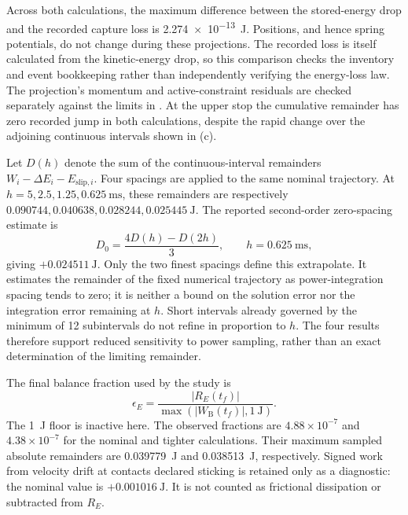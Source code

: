 \documentclass[11pt]{report}
\numberwithin{equation}{section}
\begin{document}
Across both calculations, the maximum difference between the stored-energy
drop and the recorded capture loss is \SI{2.274e-13}{J}. Positions, and hence
spring potentials, do not change during these projections. The recorded
loss is itself calculated from the kinetic-energy drop, so this comparison
checks the inventory and event bookkeeping rather than independently
verifying the energy-loss law. The projection's momentum and active-constraint
residuals are checked separately against the limits in
. At the upper stop the cumulative
remainder has zero recorded jump in both calculations, despite the rapid
change over the adjoining continuous intervals shown in
(c).

Let \(D(h)\) denote the sum of the continuous-interval remainders
\(W_i-\Delta E_i-E_{\mathrm{slip},i}\). Four spacings are applied to the
same nominal trajectory. At \(h=5,2.5,1.25,0.625~\mathrm{ms}\), these
remainders are respectively \(0.090744,0.040638,0.028244,0.025445~\mathrm{J}\).
The reported second-order zero-spacing estimate is
\begin{equation}
  D_0=\frac{4D(h)-D(2h)}{3},
  \qquad h=0.625~\mathrm{ms},
  \label{eq:energy_quadrature_extrapolate}
\end{equation}
giving \(+0.024511~\mathrm{J}\). Only the two finest spacings define this
extrapolate. It estimates the remainder of the fixed numerical trajectory
as power-integration spacing tends to zero; it is neither a bound on the
solution error nor the integration error remaining at \(h\). Short intervals
already governed by the minimum of 12 subintervals do not refine in proportion
to \(h\). The four results therefore support reduced sensitivity to power
sampling, rather than an exact determination of the limiting remainder.

The final balance fraction used by the study is
\begin{equation}
  \epsilon_E
  =\frac{|R_E(t_f)|}{\max\!\left(|W_{\mathrm{B}}(t_f)|,1~\mathrm{J}\right)}.
  \label{eq:energy_final_balance_fraction}
\end{equation}
The \SI{1}{J} floor is inactive here. The observed fractions are
\(4.88\times10^{-7}\) and \(4.38\times10^{-7}\) for the nominal and tighter
calculations. Their maximum sampled absolute remainders are
\SI{0.039779}{J} and \SI{0.038513}{J}, respectively. Signed work from
velocity drift at contacts declared sticking is retained only as a
diagnostic: the nominal value is \(+0.001016~\mathrm{J}\). It is not counted
as frictional dissipation or subtracted from \(R_E\).
\end{document}
